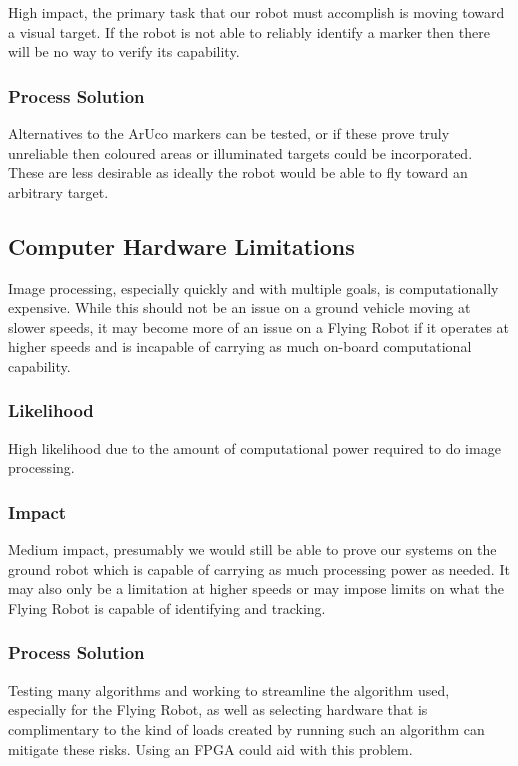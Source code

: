 \documentclass{article}
\begin{document}
		High impact, the primary task that our robot must accomplish is moving toward a visual target. If the robot is not able to reliably identify a marker then there will be no way to verify its capability.
		
		\subsubsection{Process Solution}
		
		Alternatives to the ArUco markers can be tested, or if these prove truly unreliable then coloured areas or illuminated targets could be incorporated. These are less desirable as ideally the robot would be able to fly toward an arbitrary target.
		
	\subsection{Computer Hardware Limitations}
	
	Image processing, especially quickly and with multiple goals, is computationally expensive. While this should not be an issue on a ground vehicle moving at slower speeds, it may become more of an issue on a Flying Robot if it operates at higher speeds and is incapable of carrying as much on-board computational capability.
	
		\subsubsection{Likelihood}

		High likelihood due to the amount of computational power required to do image processing. 
		
		\subsubsection{Impact}
		
		Medium impact, presumably we would still be able to prove our systems on the ground robot which is capable of carrying as much processing power as needed. It may also only be a limitation at higher speeds or may impose limits on what the Flying Robot is capable of identifying and tracking. 
		
		\subsubsection{Process Solution}
		
		Testing many algorithms and working to streamline the algorithm used, especially for the Flying Robot, as well as selecting hardware that is complimentary to the kind of loads created by running such an algorithm can mitigate these risks. Using an FPGA could aid with this problem.
	
\end{document}

